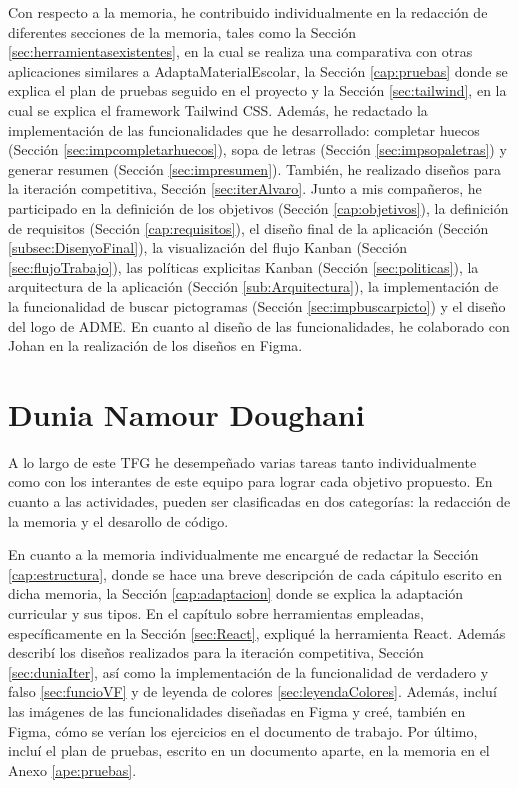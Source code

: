 Con respecto a la memoria, he contribuido individualmente en la redacción de diferentes secciones de la memoria, tales como la Sección \ref{sec:herramientasexistentes}, en la cual se realiza una comparativa con otras aplicaciones similares a AdaptaMaterialEscolar, la Sección \ref{cap:pruebas} donde se explica el plan de pruebas seguido en el proyecto y la Sección \ref{sec:tailwind}, en la cual se explica el framework Tailwind CSS. Además, he redactado la implementación de las funcionalidades que he desarrollado: completar huecos (Sección \ref{sec:impcompletarhuecos}), sopa de letras (Sección \ref{sec:impsopaletras}) y generar resumen (Sección \ref{sec:impresumen}). También, he realizado diseños para la iteración competitiva, Sección \ref{sec:iterAlvaro}. Junto a mis compañeros, he participado en la definición de los objetivos (Sección \ref{cap:objetivos}), la definición de requisitos (Sección \ref{cap:requisitos}), el diseño final de la aplicación (Sección \ref{subsec:DisenyoFinal}), la visualización del flujo Kanban (Sección \ref{sec:flujoTrabajo}), las políticas explicitas Kanban (Sección \ref{sec:politicas}), la arquitectura de la aplicación (Sección \ref{sub:Arquitectura}), la implementación de la funcionalidad de buscar pictogramas (Sección \ref{sec:impbuscarpicto}) y el diseño del logo de ADME. En cuanto al diseño de las funcionalidades, he colaborado con Johan en la realización de los diseños en Figma.

\section{Dunia Namour Doughani}
A lo largo de este TFG he desempeñado varias tareas tanto individualmente como con los interantes de este equipo para lograr cada objetivo propuesto. En cuanto a las actividades, pueden ser clasificadas en dos categorías: la redacción de la memoria y el desarollo de código.

En cuanto a la memoria individualmente me encargué de redactar
la Sección \ref{cap:estructura}, donde se hace una breve descripción de cada cápitulo escrito en dicha memoria, la Sección \ref{cap:adaptacion} donde se explica la adaptación curricular y sus tipos. En el capítulo sobre herramientas empleadas, específicamente en la Sección \ref{sec:React}, expliqué la herramienta React. Además describí los diseños realizados para la iteración competitiva, Sección \ref{sec:duniaIter}, así como la implementación de la funcionalidad de verdadero y falso \ref{sec:funcioVF} y de leyenda de colores \ref{sec:leyendaColores}. Además, incluí las imágenes de las funcionalidades diseñadas en Figma y creé, también en Figma, cómo se verían los ejercicios en el documento de trabajo.
Por último, incluí el plan de pruebas, escrito en un documento aparte, en la memoria en el Anexo \ref{ape:pruebas}.

